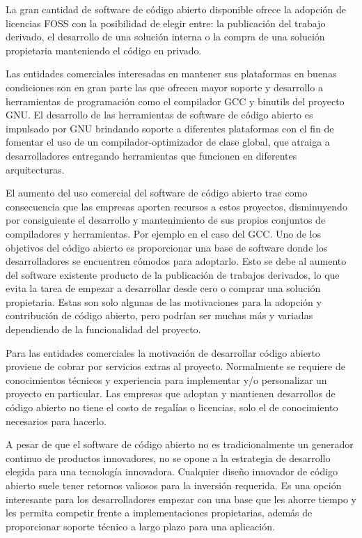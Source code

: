 La gran cantidad de software de código abierto disponible ofrece la
adopción de licencias FOSS con la posibilidad de elegir entre: la
publicación del trabajo derivado, el desarrollo de una solución
interna o la compra de una solución propietaria manteniendo el código
en privado.

Las entidades comerciales interesadas en mantener sus plataformas en
buenas condiciones son en gran parte las que ofrecen mayor soporte y
desarrollo a herramientas de programación como el compilador GCC y
binutils del proyecto GNU. El desarrollo de las herramientas de
software de código abierto es impulsado por GNU brindando soporte a
diferentes plataformas con el fin de fomentar el uso de un
compilador-optimizador de clase global, que atraiga a desarrolladores
entregando herramientas que funcionen en diferentes arquitecturas.

El aumento del uso comercial del software de código abierto trae como
consecuencia que las empresas aporten recursos a estos proyectos, disminuyendo por consiguiente el desarrollo y mantenimiento de sus
propios conjuntos de compiladores y herramientas. Por ejemplo en el
caso del GCC. Uno de los objetivos del código abierto es proporcionar
una base de software donde los desarrolladores se encuentren cómodos
para adoptarlo. Esto se debe al aumento del software existente
producto de la publicación de trabajos derivados, lo que evita la
tarea de empezar a desarrollar desde cero o comprar una solución
propietaria. Estas son solo algunas de las motivaciones para la
adopción y contribución de código abierto, pero podrían ser muchas más
y variadas dependiendo de la funcionalidad del proyecto.

Para las entidades comerciales la motivación de desarrollar código
abierto proviene de cobrar por servicios extras al
proyecto. Normalmente se requiere de conocimientos técnicos y
experiencia para implementar y/o personalizar un proyecto en
particular. Las empresas que adoptan y mantienen desarrollos de código
abierto no tiene el costo de regalías o licencias, solo el de
conocimiento necesarios para hacerlo.

A pesar de que el software de código abierto no es tradicionalmente un
generador continuo de productos innovadores, no se opone a la
estrategia de desarrollo elegida para una tecnología
innovadora. Cualquier diseño innovador de código abierto suele tener
retornos valiosos para la inversión requerida. Es una opción
interesante para los desarrolladores empezar con una base que les
ahorre tiempo y les permita competir frente a implementaciones
propietarias, además de proporcionar soporte técnico a
largo plazo para una aplicación.

